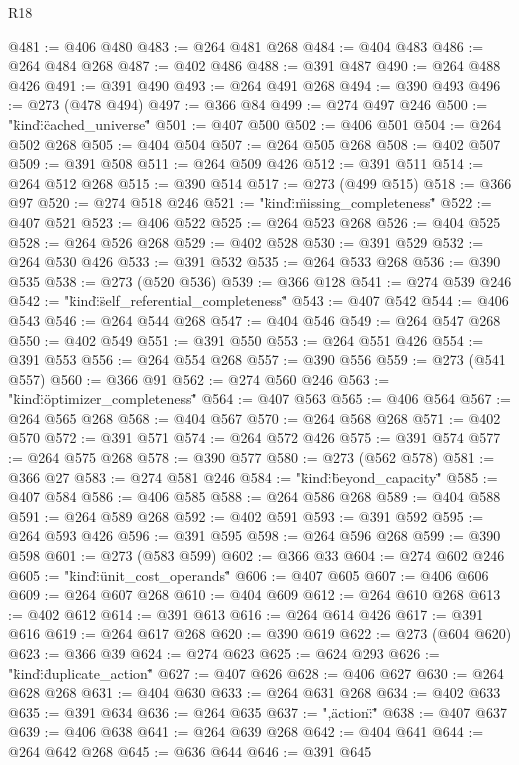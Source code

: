 \begin{lexlean}{R18}
\begin{coremodule}
{{{@481 := @406 @480
@483 := @264 @481 @268
@484 := @404 @483
@486 := @264 @484 @268
@487 := @402 @486
@488 := @391 @487
@490 := @264 @488 @426
@491 := @391 @490
@493 := @264 @491 @268
@494 := @390 @493
@496 := @273 (@478 @494)
@497 := @366 @84
@499 := @274 @497 @246
@500 := "{\"kind\":\"cached_universe\""
@501 := @407 @500
@502 := @406 @501
@504 := @264 @502 @268
@505 := @404 @504
@507 := @264 @505 @268
@508 := @402 @507
@509 := @391 @508
@511 := @264 @509 @426
@512 := @391 @511
@514 := @264 @512 @268
@515 := @390 @514
@517 := @273 (@499 @515)
@518 := @366 @97
@520 := @274 @518 @246
@521 := "{\"kind\":\"missing_completeness\""
@522 := @407 @521
@523 := @406 @522
@525 := @264 @523 @268
@526 := @404 @525
@528 := @264 @526 @268
@529 := @402 @528
@530 := @391 @529
@532 := @264 @530 @426
@533 := @391 @532
@535 := @264 @533 @268
@536 := @390 @535
@538 := @273 (@520 @536)
@539 := @366 @128
@541 := @274 @539 @246
@542 := "{\"kind\":\"self_referential_completeness\""
@543 := @407 @542
@544 := @406 @543
@546 := @264 @544 @268
@547 := @404 @546
@549 := @264 @547 @268
@550 := @402 @549
@551 := @391 @550
@553 := @264 @551 @426
@554 := @391 @553
@556 := @264 @554 @268
@557 := @390 @556
@559 := @273 (@541 @557)
@560 := @366 @91
@562 := @274 @560 @246
@563 := "{\"kind\":\"optimizer_completeness\""
@564 := @407 @563
@565 := @406 @564
@567 := @264 @565 @268
@568 := @404 @567
@570 := @264 @568 @268
@571 := @402 @570
@572 := @391 @571
@574 := @264 @572 @426
@575 := @391 @574
@577 := @264 @575 @268
@578 := @390 @577
@580 := @273 (@562 @578)
@581 := @366 @27
@583 := @274 @581 @246
@584 := "{\"kind\":\"beyond_capacity\""
@585 := @407 @584
@586 := @406 @585
@588 := @264 @586 @268
@589 := @404 @588
@591 := @264 @589 @268
@592 := @402 @591
@593 := @391 @592
@595 := @264 @593 @426
@596 := @391 @595
@598 := @264 @596 @268
@599 := @390 @598
@601 := @273 (@583 @599)
@602 := @366 @33
@604 := @274 @602 @246
@605 := "{\"kind\":\"unit_cost_operands\""
@606 := @407 @605
@607 := @406 @606
@609 := @264 @607 @268
@610 := @404 @609
@612 := @264 @610 @268
@613 := @402 @612
@614 := @391 @613
@616 := @264 @614 @426
@617 := @391 @616
@619 := @264 @617 @268
@620 := @390 @619
@622 := @273 (@604 @620)
@623 := @366 @39
@624 := @274 @623
@625 := @624 @293
@626 := "{\"kind\":\"duplicate_action\""
@627 := @407 @626
@628 := @406 @627
@630 := @264 @628 @268
@631 := @404 @630
@633 := @264 @631 @268
@634 := @402 @633
@635 := @391 @634
@636 := @264 @635
@637 := ",\"action\":\""
@638 := @407 @637
@639 := @406 @638
@641 := @264 @639 @268
@642 := @404 @641
@644 := @264 @642 @268
@645 := @636 @644
@646 := @391 @645
}}}}}}}}}}
\end{coremodule}
\end{lexlean}
